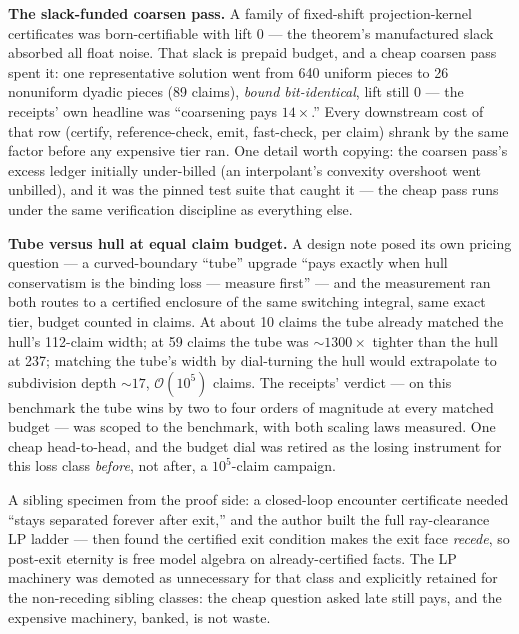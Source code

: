 \textbf{The slack-funded coarsen pass.} A family of fixed-shift
projection-kernel certificates was born-certifiable with lift $0$ ---
the theorem's manufactured slack absorbed all float noise. That slack
is prepaid budget, and a cheap coarsen pass spent it: one
representative solution went from 640 uniform pieces to 26 nonuniform
dyadic pieces (89 claims), \emph{bound bit-identical}, lift still $0$
--- the receipts' own headline was ``coarsening pays $14\times$.''
Every downstream cost of that row (certify, reference-check, emit,
fast-check, per claim) shrank by the same factor before any expensive
tier ran. One detail worth copying: the coarsen pass's excess
ledger initially under-billed (an interpolant's convexity overshoot
went unbilled), and it was the pinned test suite that caught it --- the
cheap pass runs under the same verification discipline as everything else.

\textbf{Tube versus hull at equal claim budget.} A design note posed
its own pricing question --- a curved-boundary ``tube'' upgrade ``pays
exactly when hull conservatism is the binding loss --- measure first''
--- and the measurement ran both routes to a certified enclosure of the
same switching integral, same exact tier, budget counted in claims. At
about 10 claims the tube already matched the hull's 112-claim width; at
59 claims the tube was ${\sim}1300\times$ tighter than the hull at 237;
matching the tube's width by dial-turning the hull would extrapolate to
subdivision depth ${\sim}17$, $\mathcal{O}(10^5)$ claims. The
receipts' verdict --- on this benchmark the tube wins by two to four
orders of magnitude at every matched budget --- was scoped to the
benchmark, with both scaling laws measured. One cheap head-to-head, and
the budget dial was retired as the losing instrument for this loss
class \emph{before}, not after, a $10^5$-claim campaign.

A sibling specimen from the proof side: a closed-loop encounter
certificate needed ``stays separated forever after exit,'' and the
author built the full ray-clearance LP ladder --- then found the
certified exit condition makes the exit face \emph{recede}, so
post-exit eternity is free model algebra on already-certified facts.
The LP machinery was demoted as unnecessary for that class and
explicitly retained for the non-receding sibling classes: the cheap
question asked late still pays, and the expensive machinery, banked, is
not waste.

